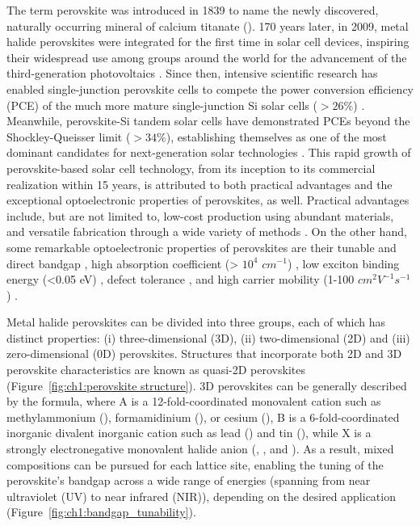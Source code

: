 The term perovskite was introduced in 1839 to name the newly discovered, naturally occurring mineral of calcium titanate (). 170 years later, in 2009, metal halide perovskites were integrated for the first time in solar cell devices, inspiring their widespread use among groups around the world for the advancement of the third-generation photovoltaics \cite{Kojima2009OrganometalCells}. Since then, intensive scientific research has enabled single-junction perovskite cells to compete the power conversion efficiency (PCE) of the much more mature single-junction Si solar cells ($> 26\%$) \cite{Green2024Solar64}. Meanwhile, perovskite-Si tandem solar cells have demonstrated PCEs beyond the Shockley-Queisser limit ($>34\%$), establishing themselves as one of the most dominant candidates for next-generation solar technologies \cite{Hasan2024StabilityReview, Noman2024ATechnology}. This rapid growth of perovskite-based solar cell technology, from its inception to its commercial realization within 15 years, is attributed to both practical advantages and the exceptional optoelectronic properties of perovskites, as well. Practical advantages include, but are not limited to, low-cost production using abundant materials, and versatile fabrication through a wide variety of methods \cite{Fan2014Perovskite-basedCells}. On the other hand, some remarkable optoelectronic properties of perovskites are their tunable and direct bandgap \cite{Gholipour2020BandgapMaterials}, high absorption coefficient (> $10^4$ $cm^{-1}$) \cite{Park2015PerovskiteTechnology}, low exciton binding energy (<0.05 eV) \cite{Lin2015Electro-opticsCells}, defect tolerance \cite{Kumar2021RoleApplications}, and high carrier mobility (1-100 $cm^2V^{-1}s^{-1}$) \cite{Herz2017Charge-CarrierLimits}. 


Metal halide perovskites can be divided into three groups, each of which has distinct properties: (i) three-dimensional (3D), (ii) two-dimensional (2D) and (iii) zero-dimensional (0D) perovskites. Structures that incorporate both 2D and 3D perovskite characteristics are known as quasi-2D perovskites (Figure~\ref{fig:ch1:perovskite structure}). 3D perovskites can be generally described by the  formula, where A is a 12-fold-coordinated monovalent cation such as methylammonium (), formamidinium (), or cesium (), B is a 6-fold-coordinated inorganic divalent inorganic cation such as lead () and tin (), while X is a strongly electronegative monovalent halide anion (, , and ). As a result, mixed compositions can be pursued for each lattice site, enabling the tuning of the perovskite's bandgap across a wide range of energies (spanning from near ultraviolet (UV) to near infrared (NIR)), depending on the desired application (Figure~\ref{fig:ch1:bandgap_tunability}).

